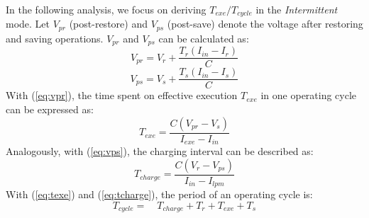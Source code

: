In the following analysis, we focus on deriving $T_{exe} / T_{cycle}$ in the \textit{Intermittent} mode. Let $V_{pr}$ (post-restore) and $V_{ps}$ (post-save) denote the voltage after restoring and saving operations. $V_{pr}$ and $V_{ps}$ can be calculated as:
\begin{equation}
  V_{pr} = V_{r} + \frac{T_{r} (I_{in} - I_{r})}{C}
  \label{eq:vpr}
\end{equation}
\begin{equation}
  V_{ps} = V_{s} + \frac{T_{s} (I_{in} - I_{s})}{C}
  \label{eq:vps}
\end{equation}
With (\ref{eq:vpr}), the time spent on effective execution $T_{exe}$ in one operating cycle can be expressed as:
\begin{equation}
    T_{exe} = \frac{C(V_{pr} - V_{s})}{I_{exe} - I_{in}} 
  \label{eq:texe}
\end{equation}
Analogously, with (\ref{eq:vps}), the charging interval can be described as:
\begin{equation}
    T_{charge} = \frac{C(V_{r} - V_{ps})}{I_{in} - I_{lpm}}
  \label{eq:tcharge}
\end{equation}
With (\ref{eq:texe}) and (\ref{eq:tcharge}), the period of an operating cycle is:
\begin{equation}
    T_{cycle} = \quad T_{charge} + T_{r} + T_{exe} + T_{s} 
  \label{eq:tperiod}
\end{equation}

